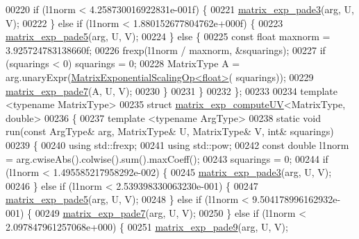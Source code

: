 \begin{DoxyCode}
00220     \textcolor{keywordflow}{if} (l1norm < 4.258730016922831e-001f) \{
00221       \hyperlink{namespace_eigen_1_1internal_a7e6cf2e01b6fb376d33b9bb8183e5777}{matrix\_exp\_pade3}(arg, U, V);
00222     \} \textcolor{keywordflow}{else} \textcolor{keywordflow}{if} (l1norm < 1.880152677804762e+000f) \{
00223       \hyperlink{namespace_eigen_1_1internal_af4992d182490219270a24aaa8285e63a}{matrix\_exp\_pade5}(arg, U, V);
00224     \} \textcolor{keywordflow}{else} \{
00225       \textcolor{keyword}{const} \textcolor{keywordtype}{float} maxnorm = 3.925724783138660f;
00226       frexp(l1norm / maxnorm, &squarings);
00227       \textcolor{keywordflow}{if} (squarings < 0) squarings = 0;
00228       MatrixType A = arg.unaryExpr(\hyperlink{struct_eigen_1_1internal_1_1_matrix_exponential_scaling_op}{MatrixExponentialScalingOp<float>}(
      squarings));
00229       \hyperlink{namespace_eigen_1_1internal_a1abecb439e6cb1b5188828cdb7e0ab60}{matrix\_exp\_pade7}(A, U, V);
00230     \}
00231   \}
00232 \};
00233 
00234 \textcolor{keyword}{template} <\textcolor{keyword}{typename} MatrixType>
00235 \textcolor{keyword}{struct }\hyperlink{struct_eigen_1_1internal_1_1matrix__exp__compute_u_v}{matrix\_exp\_computeUV}<MatrixType, double>
00236 \{
00237   \textcolor{keyword}{template} <\textcolor{keyword}{typename} ArgType>
00238   \textcolor{keyword}{static} \textcolor{keywordtype}{void} run(\textcolor{keyword}{const} ArgType& arg, MatrixType& U, MatrixType& V, \textcolor{keywordtype}{int}& squarings)
00239   \{
00240     \textcolor{keyword}{using} std::frexp;
00241     \textcolor{keyword}{using} std::pow;
00242     \textcolor{keyword}{const} \textcolor{keywordtype}{double} l1norm = arg.cwiseAbs().colwise().sum().maxCoeff();
00243     squarings = 0;
00244     \textcolor{keywordflow}{if} (l1norm < 1.495585217958292e-002) \{
00245       \hyperlink{namespace_eigen_1_1internal_a7e6cf2e01b6fb376d33b9bb8183e5777}{matrix\_exp\_pade3}(arg, U, V);
00246     \} \textcolor{keywordflow}{else} \textcolor{keywordflow}{if} (l1norm < 2.539398330063230e-001) \{
00247       \hyperlink{namespace_eigen_1_1internal_af4992d182490219270a24aaa8285e63a}{matrix\_exp\_pade5}(arg, U, V);
00248     \} \textcolor{keywordflow}{else} \textcolor{keywordflow}{if} (l1norm < 9.504178996162932e-001) \{
00249       \hyperlink{namespace_eigen_1_1internal_a1abecb439e6cb1b5188828cdb7e0ab60}{matrix\_exp\_pade7}(arg, U, V);
00250     \} \textcolor{keywordflow}{else} \textcolor{keywordflow}{if} (l1norm < 2.097847961257068e+000) \{
00251       \hyperlink{namespace_eigen_1_1internal_a218447e97bf869bf354f92e020a7355a}{matrix\_exp\_pade9}(arg, U, V);

\end{DoxyCode}
